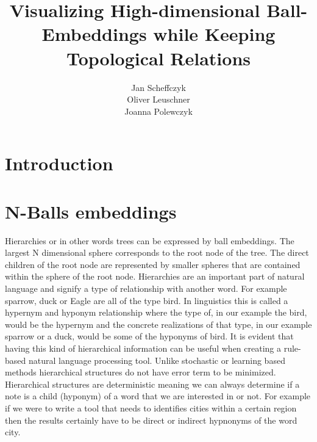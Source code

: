 \documentclass[]{article}
\title{Visualizing High-dimensional Ball-Embeddings
	while Keeping Topological Relations}
\author{Jan Scheffczyk \\ Oliver Leuschner \\ Joanna Polewczyk}
\begin{document}
\maketitle

%
%
%
\newpage
\section{Introduction}



\section{N-Balls embeddings}
\label{sec::ball}
Hierarchies or in other words trees can be expressed by ball embeddings. The largest N dimensional sphere corresponds to the root node of the tree. The direct children of the root node are represented by smaller spheres that are contained within the sphere of the root node. Hierarchies are an important part of natural language and signify a type of relationship with another word. For example sparrow, duck or Eagle are all of the type bird. In linguistics this is called a hypernym and hyponym relationship where the type of, in our example the bird, would be the hypernym and the concrete realizations of that type, in our example sparrow or a duck, would be some of the hyponyms of bird. It is evident that having this kind of hierarchical information can be useful when creating a rule-based natural language processing tool. Unlike stochastic or learning based methods hierarchical structures do not have error term to be minimized. Hierarchical structures are deterministic meaning we can always determine if a note is a child (hyponym) of a word that we are interested in or not. For example if we were to write a tool that needs to identifies cities within a certain region then the results certainly have to be direct or indirect hypnonyms of the word city.
\par
\end{document}
